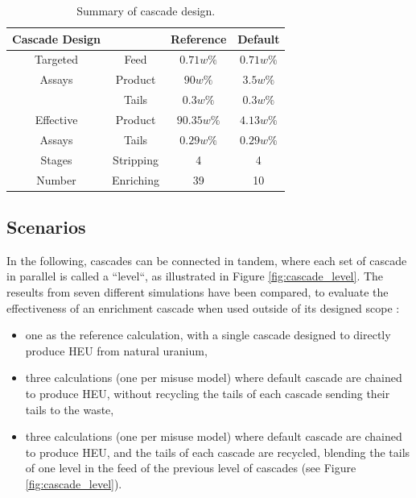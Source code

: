 \begin{table}[htb]
\centering
  \caption{Summary of cascade design.}
\begin{tabular}{cccc}
\toprule

Cascade Design &       & Reference   & Default    \\
\midrule
Targeted  & Feed       & $0.71w\%$   & $0.71w\%$  \\
Assays    & Product    & $90w\%$     & $3.5w\%$   \\
          & Tails      & $0.3w\%$   & $0.3w\%$   \\
\midrule
Effective & Product    & $90.35w\%$  & $4.13w\%$  \\
Assays    & Tails      & $0.29w\%$   & $0.29w\%$  \\ 
\midrule
Stages    & Stripping  & 4          & 4          \\
Number    & Enriching  & 39         & 10         \\
\bottomrule
\end{tabular}
  \label{tab:cascade_config}
\end{table}


\subsection{Scenarios}
In the following, cascades can be connected in tandem, where each set of cascade
in parallel is called a ``level``, as illustrated in Figure
\ref{fig:cascade_level}.
The reseults from seven different simulations have been compared, to evaluate the effectiveness
of an enrichment cascade when used outside of its designed scope :
\begin{itemize}
\item one as the reference calculation, with a single cascade designed to
    directly produce \gls{HEU} from natural uranium,
\item three calculations (one per misuse model) where default cascade are
    chained to produce \gls{HEU}, without recycling the tails of each cascade
    sending their tails to the waste,
\item three calculations (one per misuse model) where default cascade are
    chained to produce \gls{HEU}, and the tails of each cascade are recycled, blending
    the tails of one level in the feed of the previous level of
    cascades (see Figure \ref{fig:cascade_level}).
\end{itemize}

